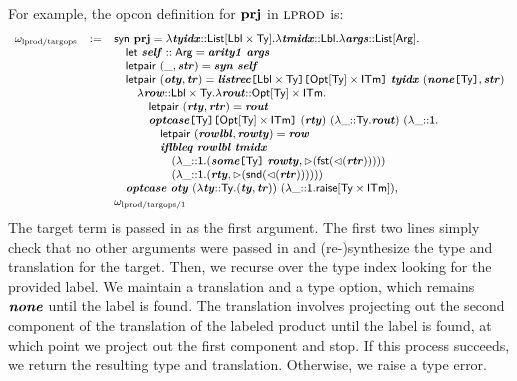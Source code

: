 \documentclass{llncs}
\begin{document}
For example, the opcon definition for $\textbf{prj}$ in $\textsc{lprod}$ is:
\[\small
\begin{array}{lcl}
\omega_\text{lprod/targops} & := & \keyw{syn}~\opname{prj}=\slam{\klist{\klbl\times\kty}}{\svar{tyidx}}{
    \slam{\klbl}{\svar{tmidx}}{
        \slam{\kargs}{\svar{args}}{\\&&
            \quad \keyw{let}~\svar{self} :: \keyw{Arg} = \svar{arity1}~\svar{args}\\&&
            \quad \keyw{letpair}~(\_, \svar{str}) = \svar{syn}~\svar{self}\\&&
            \quad \keyw{letpair}~(\svar{oty}, \svar{tr})=\skap{\keyw{Opt}[\kty]\times\kitm}{\skap{\klbl\times\kty}{\svar{listrec}}}~\svar{tyidx}~(\skap{\kty}{\svar{none}}, \svar{str})\\&&
            \quad\quad \slam{\klbl\times\kty}{\svar{row}}{
                \slam{\keyw{Opt}[\kty]\times\kitm}{\svar{rout}}{\\&&
                    \quad\quad\quad \keyw{letpair}~(\svar{rty}, \svar{rtr})=\svar{rout}\\&&
                    \quad\quad\quad \skap{\keyw{Opt}[\kty]\times\kitm}{\skap{\kty}{\svar{optcase}}}~(\svar{rty})~(\slam{\kty}{\_}{\svar{rout}})~(\slam{\kunit}{\_}{\\&&
                        \quad\quad\quad\quad\keyw{letpair}~(\svar{rowlbl}, \svar{rowty})=\svar{row}\\&&
                        \quad\quad\quad\quad \svar{iflbleq}~\svar{rowlbl}~\svar{tmidx}~\\&&
                        \quad\quad\quad\quad\quad (\slam{\kunit}{\_}{(\skap{\kty}{\svar{some}}~\svar{rowty}, \sqitm{\keyw{fst}(\quq{\svar{rtr}})})})\\&&
                        \quad\quad\quad\quad\quad (\slam{\kunit}{\_}{(\svar{rty}, \sqitm{\keyw{snd}(\quq{\svar{rtr}})})}))
                    }
                }
            }\\&&
            \quad \svar{optcase}~\svar{oty}~(\slam{\kty}{\svar{ty}}{(\svar{ty}, \svar{tr})})~(\slam{\kunit}{\_}{\sraise{\kty\times\kitm}})
        }
    }
},\\&&
\omega_\text{lprod/targops/1}
\end{array}
\]
The target term is passed in as the first argument. The first two lines simply check that no other arguments were passed in and (re-)synthesize the type and translation for the target. Then, we recurse over the type index looking for the provided label. We maintain a translation and a type option, which remains ${\textbf{\textit{none}}}$ until the label is found. The translation involves projecting out the second component of the translation of the labeled product until the label is found, at which point we project out the first component and stop. If this process succeeds, we return the resulting type and translation. Otherwise, we raise a type error. 
\end{document}
